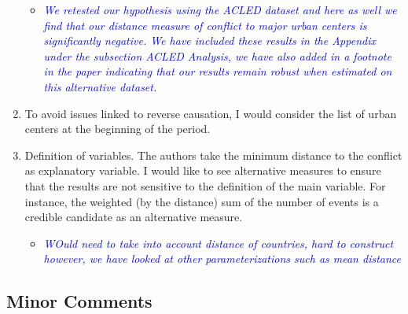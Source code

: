 \begin{enumerate}
\begin{itemize}
\item \textcolor{blue}{\emph{
	We retested our hypothesis using the ACLED dataset and here as well we find that our distance measure of conflict to major urban centers is significantly negative. We have included these results in the Appendix under the subsection ACLED Analysis, we have also added in a footnote in the paper indicating that our results remain robust when estimated on this alternative dataset.
}}
\end{itemize}

\item To avoid issues linked to reverse causation, I would consider the list of urban centers at the beginning of the period.


\item Definition of variables. The authors take the minimum distance to the conflict as explanatory variable. I would like to see alternative measures to ensure that the results are not sensitive to the definition of the main variable. For instance, the weighted (by the distance) sum of the number of events is a credible candidate as an alternative measure.

\begin{itemize}
\item \textcolor{blue}{\emph{
	WOuld need to take into account distance of countries, hard to construct
	however, we have looked at other parameterizations such as mean distance
}}
\end{itemize}

\end{enumerate}

\subsection{Minor Comments}

